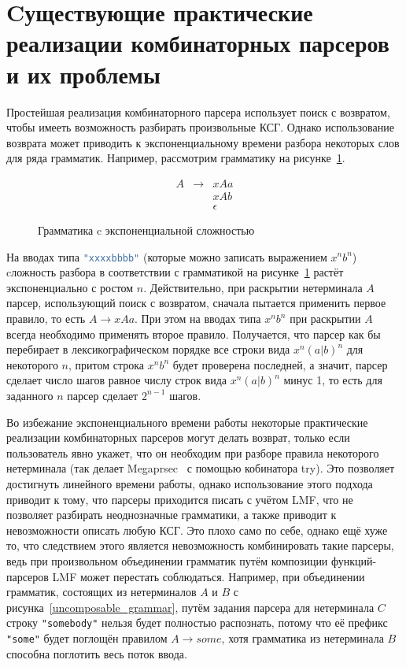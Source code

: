 \documentclass[times]{itmo-student-thesis}
\begin{document}
\section{Cуществующие практические реализации комбинаторных парсеров и их проблемы}\label{sec:current_parser_combinators_problems}

Простейшая реализация комбинаторного парсера использует поиск с возвратом, чтобы имееть возможность разбирать
произвольные  КСГ. Однако использование возврата может приводить к экспоненциальному времени разбора некоторых слов
для ряда грамматик. Например, рассмотрим грамматику на рисунке~\ref{exp_grammar}.

\begin{figure}[!h]
\caption{Грамматика c экспоненциальной сложностью}\label{exp_grammar}
\[
    \begin{array}{lll}
        A & \to & xAa      \\
          &     & xAb      \\
          &     & \epsilon
    \end{array}
\]
\end{figure}

На вводах типа \lstinline[language=Haskell]{"xxxxbbbb"} (которые можно записать выражением $x^nb^n$) cложность разбора
в соответствии с грамматикой на рисунке~\ref{exp_grammar} растёт экспоненциально с ростом $n$.
Действительно, при раскрытии нетерминала $A$ парсер, использующий поиск с возвратом, сначала пытается применить первое
правило, то есть $A \to xAa$. При этом на вводах типа $x^nb^n$ при раскрытии
$A$ всегда необходимо применять второе правило. Получается, что парсер как бы перебирает в
лексикографическом порядке все строки вида $x^n(a|b)^n$ для некоторого $n$, притом строка
$x^nb^n$ будет проверена последней, а значит, парсер сделает число шагов равное числу строк вида
$x^n(a|b)^n$ минус 1, то есть для заданного $n$ парсер сделает $2^{n-1}$ шагов.

Во избежание экспоненциального времени работы некоторые практические реализации комбинаторных парсеров могут делать
возврат, только если пользователь явно укажет, что он необходим при разборе правила некоторого нетерминала (так
делает Megaprsec~\cite{noauthor_megaparsec_nodate} с помощью кобинатора try). Это позволяет достигнуть линейного времени работы,
однако использование этого подхода приводит к тому, что парсеры приходится писать с учётом LMF, что не
позволяет разбирать неоднозначные грамматики, а также приводит к невозможности описать любую КСГ. Это плохо само по
себе, однако ещё хуже то, что следствием этого является невозможность комбинировать такие парсеры, ведь при
произвольном объединении грамматик путём композиции функций-парсеров LMF может перестать
соблюдаться. Например, при объединении грамматик, состоящих из нетерминалов $A$ и
$B$ с рисунка~\ref{uncomposable_grammar}, путём задания парсера для нетерминала $C$ строку
\lstinline|"somebody"| нельзя будет полностью распознать, потому что её префикс \lstinline|"some"| будет поглощён правилом
$A \to some$, хотя грамматика из нетерминала $B$ способна поглотить весь поток ввода.
\end{document}
